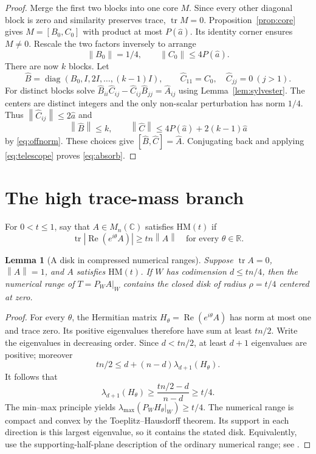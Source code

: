 \documentclass[11pt]{article}
\newtheorem{lemma}[theorem]{Lemma}
\theoremstyle{remark}
\newcommand{\C}{\mathbb C}
\newcommand{\R}{\mathbb R}
\newcommand{\tr}{\operatorname{tr}}
\newcommand{\Rea}{\operatorname{Re}}
\newcommand{\diag}{\operatorname{diag}}
\newcommand{\norm}[1]{\left\lVert#1\right\rVert}
\newcommand{\comm}[2]{[#1,#2]}
\newcommand{\HM}{\mathrm{HM}}
\numberwithin{equation}{section}
\begin{document}
\begin{proof}
Merge the first two blocks into one core $M$. Since every other diagonal block
is zero and similarity preserves trace, $\tr M=0$. Proposition~\ref{prop:core}
gives $M=\comm{B_0}{C_0}$ with product at most $P(\widehat a)$. Its identity
corner ensures $M\ne0$. Rescale the two factors inversely to arrange
\[
 \norm{B_0}=1/4,\qquad \norm{C_0}\le4P(\widehat a).
\]
There are now $k$ blocks. Let
\[
 \widehat B=\diag(B_0,I,2I,\ldots,(k-1)I),\qquad
 \widehat C_{11}=C_0,\quad \widehat C_{jj}=0\ (j>1).
\]
For distinct blocks solve
$\widehat B_{ii}\widehat C_{ij}-\widehat C_{ij}\widehat B_{jj}=\widehat A_{ij}$
using Lemma~\ref{lem:sylvester}. The centers are distinct integers and the only
non-scalar perturbation has norm $1/4$. Thus
$\norm{\widehat C_{ij}}\le2\widehat a$ and
\[
 \norm{\widehat B}\le k,\qquad
 \norm{\widehat C}\le4P(\widehat a)+2(k-1)\widehat a
\]
by \eqref{eq:offnorm}. These choices give
$\comm{\widehat B}{\widehat C}=\widehat A$. Conjugating back and applying
\eqref{eq:telescope} proves \eqref{eq:absorb}.
\end{proof}

\section{The high trace-mass branch}\label{sec:high}
For $0<t\le1$, say that $A\in M_n(\C)$ satisfies $\HM(t)$ if
\begin{equation}\label{eq:HM}
 \tr|\Rea(e^{i\theta}A)|\ge tn\norm A\quad\text{for every }\theta\in\R.
\end{equation}

\begin{lemma}[A disk in compressed numerical ranges]\label{lem:disk}
Suppose $\tr A=0$, $\norm A=1$, and $A$ satisfies $\HM(t)$. If $W$ has
codimension $d\le tn/4$, then the numerical range of $T=P_WA|_W$ contains the
closed disk of radius $\rho=t/4$ centered at zero.
\end{lemma}
\begin{proof}
For every $\theta$, the Hermitian matrix $H_\theta=\Rea(e^{i\theta}A)$ has norm
at most one and trace zero. Its positive eigenvalues therefore have sum at
least $tn/2$. Write the eigenvalues in decreasing order. Since $d<tn/2$, at
least $d+1$ eigenvalues are positive; moreover
\[
 tn/2\le d+(n-d)\lambda_{d+1}(H_\theta).
\]
It follows that
\[
 \lambda_{d+1}(H_\theta)\ge
 \frac{tn/2-d}{n-d}\ge t/4.
\]
The min--max principle yields
$\lambda_{\max}(P_WH_\theta|_W)\ge t/4$. The numerical range is compact and
convex by the Toeplitz--Hausdorff theorem. Its support in each direction is
this largest eigenvalue, so it contains the stated disk. Equivalently, use the
supporting-half-plane description of the ordinary numerical range; see
\cite[Section 2]{LiSze}.
\end{proof}
\end{document}
